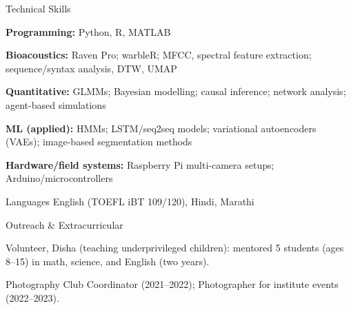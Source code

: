 \documentclass{resume}
\begin{document}
\begin{rSection}{Technical Skills}
\item {\bf Programming:} Python, R, MATLAB
\item {\bf Bioacoustics:} Raven Pro; warbleR; MFCC, spectral feature extraction; sequence/syntax analysis, DTW, UMAP
\item {\bf Quantitative:} GLMMs; Bayesian modelling; causal inference; network analysis; agent-based simulations
\item {\bf ML (applied):} HMMs; LSTM/seq2seq models; variational autoencoders (VAEs); image-based segmentation methods
\item {\bf Hardware/field systems:} Raspberry Pi multi-camera setups; Arduino/microcontrollers
\end{rSection}

\begin{rSection}{Languages}
English (TOEFL iBT 109/120), Hindi, Marathi
\end{rSection}

\begin{rSection}{Outreach \& Extracurricular }
\item Volunteer, Disha (teaching underprivileged children): mentored 5 students (ages 8--15) in math, science, and English (two years).
\item Photography Club Coordinator (2021--2022); Photographer for institute events (2022--2023).
\end{rSection}
\end{document}

